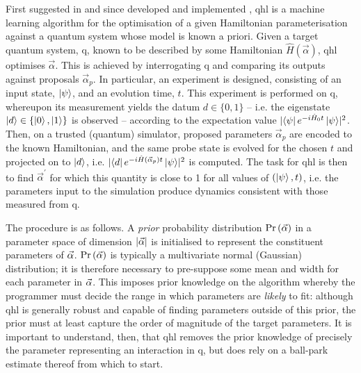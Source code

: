 \glsresetall
First suggested in \cite{Granade:2012kj} and since developed \cite{wiebe2014qhlpra, Wiebe:2014qhl} 
    and implemented \cite{gentile2020learning, wang2017experimental}, 
\gls{qhl} is a machine learning algorithm for the optimisation of a given Hamiltonian parameterisation 
    against a quantum system whose model is known a priori. 
Given a target quantum system, \gls{q}, known to be described by some Hamiltonian $\hat{H}(\vec{\alpha})$, 
    \gls{qhl} optimises $\vec{\alpha}$.
This is achieved by interrogating \gls{q} and comparing its outputs against proposals $\vec{\alpha}_p$. 
In particular, an experiment is designed, consisting of an input state, $\ket{\psi}$, and an evolution time, $t$.
This experiment is performed on \gls{q}, whereupon its measurement yields the datum $d \in \{0, 1\}$ -- 
    i.e. the eigenstate $\ket{d} \in \{ \ket{0}, \ket{1}\}$ is observed -- 
    according to the expectation value $\lvert \bra{\psi} e^{-i \hat{H}_0 t} \ket{\psi} \rvert^2$. 
Then, on a trusted (quantum) simulator, proposed parameters $\vec{\alpha}_p$ are encoded to the 
    known Hamiltonian, and the same \gls{probe} state is evolved for the chosen $t$ and projected on to $\ket{d}$, 
    i.e. $\lvert \bra{d} e^{-i \hat{H}(\vec{\alpha}_p) t } \ket{\psi} \rvert^2 $ is computed.
The task for \gls{qhl} is then to find $\vec{\alpha}^{\prime}$ for which this quantity 
    is close to 1 for all values of $(\ket{\psi}, t)$, 
    i.e. the parameters input to the simulation produce dynamics consistent with those measured from \gls{q}.
\par 

The procedure is as follows. 
A \emph{prior} probability distribution $\Pr\left(\vec{\alpha}\right)$ in a parameter space of dimension $\lvert \vec{\alpha} \rvert$ 
    is initialised to represent the constituent parameters of $\vec{\alpha}$. 
$\Pr\left(\vec{\alpha}\right)$ is typically a multivariate normal (Gaussian) distribution; 
    it is therefore necessary to pre-suppose some mean and width for each parameter in $\vec{\alpha}$. 
This imposes prior knowledge on the algorithm whereby the programmer must decide the range in 
    which parameters are \emph{likely} to fit:
    although \gls{qhl} is generally robust and capable of finding parameters outside of this prior,
    the prior must at least capture the order of magnitude of the target parameters. 
It is important to understand, then, that \gls{qhl} removes the prior knowledge 
    of precisely the parameter representing an interaction in \gls{q}, but does rely on a ball-park estimate thereof from which to start. 
\par 

